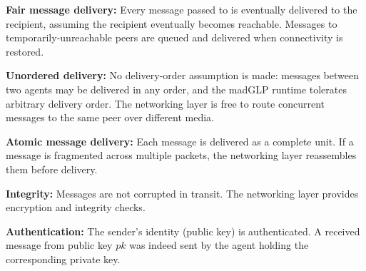 \noindent\textbf{Fair message delivery:} Every message passed to  is eventually delivered to the recipient, assuming the recipient eventually becomes reachable.  Messages to temporarily-unreachable peers are queued and delivered when connectivity is restored.

\noindent\textbf{Unordered delivery:} No delivery-order assumption is made: messages between two agents may be delivered in any order, and the madGLP runtime tolerates arbitrary delivery order.  The networking layer is free to route concurrent messages to the same peer over different media.

\noindent\textbf{Atomic message delivery:} Each message is delivered as a complete unit.  If a message is fragmented across multiple packets, the networking layer reassembles them before delivery.

\noindent\textbf{Integrity:} Messages are not corrupted in transit.  The networking layer provides encryption and integrity checks.

\noindent\textbf{Authentication:} The sender's identity (public key) is authenticated.  A received message from public key $pk$ was indeed sent by the agent holding the corresponding private key.

\bigskip

